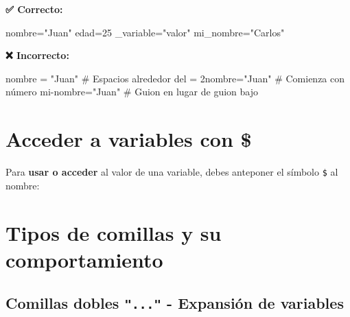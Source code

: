 \documentclass[
  spanish,
  12pt,
  letterpaper,
  DIV=11,
  numbers=noendperiod]{scrreprt}
\newenvironment{Shaded}{\begin{snugshade}}{\end{snugshade}}
\newcommand{\BuiltInTok}[1]{\textcolor[rgb]{0.00,0.23,0.31}{#1}}
\newcommand{\CommentTok}[1]{\textcolor[rgb]{0.37,0.37,0.37}{#1}}
\newcommand{\ExtensionTok}[1]{\textcolor[rgb]{0.00,0.23,0.31}{#1}}
\newcommand{\NormalTok}[1]{\textcolor[rgb]{0.00,0.23,0.31}{#1}}
\newcommand{\OperatorTok}[1]{\textcolor[rgb]{0.37,0.37,0.37}{#1}}
\newcommand{\StringTok}[1]{\textcolor[rgb]{0.13,0.47,0.30}{#1}}
\newcommand{\VariableTok}[1]{\textcolor[rgb]{0.07,0.07,0.07}{#1}}
\begin{document}
\textbf{✅ Correcto:}

\begin{Shaded}
\begin{Highlighting}[]
\VariableTok{nombre}\OperatorTok{=}\StringTok{"Juan"}
\VariableTok{edad}\OperatorTok{=}\NormalTok{25}
\VariableTok{\_variable}\OperatorTok{=}\StringTok{"valor"}
\VariableTok{mi\_nombre}\OperatorTok{=}\StringTok{"Carlos"}
\end{Highlighting}
\end{Shaded}

\textbf{❌ Incorrecto:}

\begin{Shaded}
\begin{Highlighting}[]
\ExtensionTok{nombre}\NormalTok{ = }\StringTok{"Juan"}        \CommentTok{\# Espacios alrededor del =}
\ExtensionTok{2nombre=}\StringTok{"Juan"}         \CommentTok{\# Comienza con número}
\ExtensionTok{mi{-}nombre=}\StringTok{"Juan"}       \CommentTok{\# Guion en lugar de guion bajo}
\end{Highlighting}
\end{Shaded}

\section{Acceder a variables con \$}\label{acceder-a-variables-con}

Para \textbf{usar o acceder} al valor de una variable, debes anteponer
el símbolo \texttt{\$} al nombre:

\begin{Shaded}
\end{Shaded}

\section{Tipos de comillas y su
comportamiento}\label{tipos-de-comillas-y-su-comportamiento}

\subsection{\texorpdfstring{Comillas dobles \texttt{"..."} - Expansión
de
variables}{Comillas dobles "..." - Expansión de variables}}\label{comillas-dobles-...---expansiuxf3n-de-variables}
\end{document}
